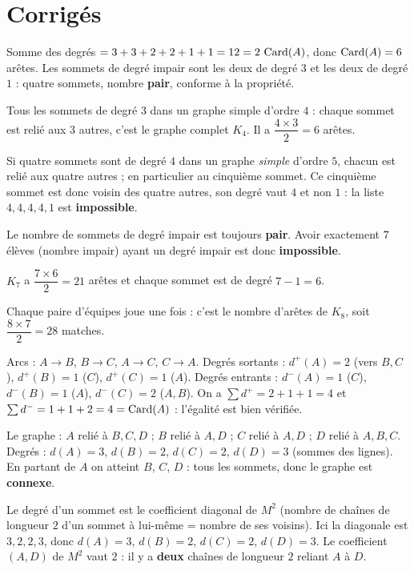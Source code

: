 \section{Corrigés}

Somme des degrés $=3+3+2+2+1+1=12=2\,\operatorname{Card}(A)$, donc $\operatorname{Card}(A)=6$ arêtes. Les sommets de
degré impair sont les deux de degré $3$ et les deux de degré $1$ : quatre sommets, nombre
\textbf{pair}, conforme à la propriété.

Tous les sommets de degré $3$ dans un graphe simple d'ordre $4$ : chaque sommet est relié
aux $3$ autres, c'est le graphe complet $K_4$. Il a $\dfrac{4\times 3}{2}=6$ arêtes.

Si quatre sommets sont de degré $4$ dans un graphe \emph{simple} d'ordre $5$, chacun est
relié aux quatre autres ; en particulier au cinquième sommet. Ce cinquième sommet est donc
voisin des quatre autres, son degré vaut $4$ et non $1$ : la liste $4,4,4,4,1$ est
\textbf{impossible}.

Le nombre de sommets de degré impair est toujours \textbf{pair}. Avoir exactement $7$ élèves
(nombre impair) ayant un degré impair est donc \textbf{impossible}.

$K_7$ a $\dfrac{7\times 6}{2}=21$ arêtes et chaque sommet est de degré $7-1=6$.

Chaque paire d'équipes joue une fois : c'est le nombre d'arêtes de $K_8$, soit
$\dfrac{8\times 7}{2}=28$ matches.

Arcs : $A\!\to\!B$, $B\!\to\!C$, $A\!\to\!C$, $C\!\to\!A$. Degrés sortants :
$d^{+}(A)=2$ (vers $B,C$), $d^{+}(B)=1$ ($C$), $d^{+}(C)=1$ ($A$). Degrés entrants :
$d^{-}(A)=1$ ($C$), $d^{-}(B)=1$ ($A$), $d^{-}(C)=2$ ($A,B$). On a $\sum d^{+}=2+1+1=4$ et
$\sum d^{-}=1+1+2=4=\operatorname{Card}(A)$ : l'égalité est bien vérifiée.

Le graphe : $A$ relié à $B,C,D$ ; $B$ relié à $A,D$ ; $C$ relié à $A,D$ ; $D$ relié à
$A,B,C$. Degrés : $d(A)=3$, $d(B)=2$, $d(C)=2$, $d(D)=3$ (sommes des lignes). En partant de
$A$ on atteint $B$, $C$, $D$ : tous les sommets, donc le graphe est \textbf{connexe}.

Le degré d'un sommet est le coefficient diagonal de $M^2$ (nombre de chaînes de longueur $2$
d'un sommet à lui-même = nombre de ses voisins). Ici la diagonale est $3,2,2,3$, donc
$d(A)=3$, $d(B)=2$, $d(C)=2$, $d(D)=3$. Le coefficient $(A,D)$ de $M^2$ vaut $2$ : il y a
\textbf{deux} chaînes de longueur $2$ reliant $A$ à $D$.


